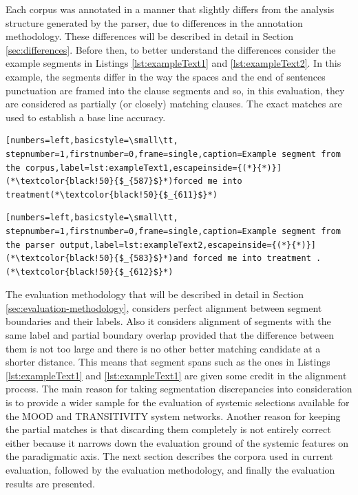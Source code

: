     Each corpus was annotated in a manner that slightly differs from the analysis structure generated by the parser, due to differences in the annotation methodology. These differences will be described in detail in Section \ref{sec:differences}. Before then, to better understand the differences consider the example segments in Listings \ref{lst:exampleText1} and \ref{lst:exampleText2}. In this example, the segments differ in the way the spaces and the end of sentences punctuation are framed into the clause segments and so, in this evaluation, they are considered as partially (or closely) matching clauses. The exact matches are used to establish a base line accuracy. 
    
\noindent
\begin{minipage}{\linewidth}
\begin{lstlisting}[numbers=left,basicstyle=\small\tt, stepnumber=1,firstnumber=0,frame=single,caption=Example segment from the corpus,label=lst:exampleText1,escapeinside={(*}{*)}]
(*\textcolor{black!50}{$_{587}$}*)forced me into treatment(*\textcolor{black!50}{$_{611}$}*)
\end{lstlisting}
\end{minipage}

\noindent
\begin{minipage}{\linewidth}
\begin{lstlisting}[numbers=left,basicstyle=\small\tt, stepnumber=1,firstnumber=0,frame=single,caption=Example segment from the parser output,label=lst:exampleText2,escapeinside={(*}{*)}]
(*\textcolor{black!50}{$_{583}$}*)and forced me into treatment .(*\textcolor{black!50}{$_{612}$}*)
\end{lstlisting}
\end{minipage}    

    The evaluation methodology that will be described in detail in Section \ref{sec:evaluation-methodology}, considers perfect alignment between segment boundaries and their labels. Also it considers alignment of segments with the same label and partial boundary overlap provided that the difference between them is not too large and there is no other better matching candidate at a shorter distance. This means that segment spans such as the ones in Listings \ref{lst:exampleText1} and \ref{lst:exampleText1} are given some credit in the alignment process. The main reason for taking segmentation discrepancies into consideration is to provide a wider sample for the evaluation of systemic selections available for the MOOD and TRANSITIVITY system networks. Another reason for keeping the partial matches is that discarding them completely is not entirely correct either because it narrows down the evaluation ground of the systemic features on the paradigmatic axis. The next section describes the corpora used in current evaluation, followed by the evaluation methodology, and finally the evaluation results are presented.

